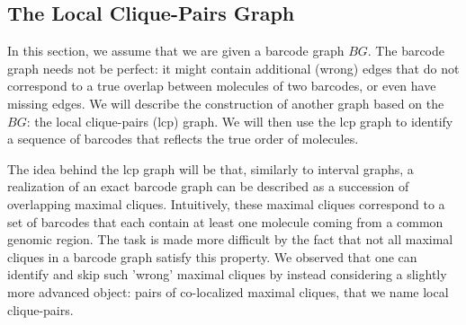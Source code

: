 %
%
%

\subsection{The Local Clique-Pairs Graph}
\label{ssec:d_graphs}

In this section, we assume that we are given a barcode graph $BG$.  The barcode graph needs not be perfect: it might contain additional (wrong) edges that do not correspond to a true overlap between molecules of two barcodes, or even have missing edges. We will describe the construction of another graph based on the $BG$: the local clique-pairs (lcp) graph. We will then use the lcp graph to identify a sequence of barcodes that reflects the true order of molecules.

The idea behind the lcp graph will be that, similarly to interval graphs, a realization of an exact barcode graph can be described as a succession of overlapping maximal cliques. Intuitively, these maximal cliques correspond to a set of barcodes that each contain at least one molecule coming from a common genomic region. %
The task is made more difficult by the fact that not all maximal cliques in a barcode graph satisfy this property. 
We observed that one can identify and skip such 'wrong' maximal cliques by instead considering a slightly more advanced object: pairs of co-localized maximal cliques, that we name local clique-pairs.  

